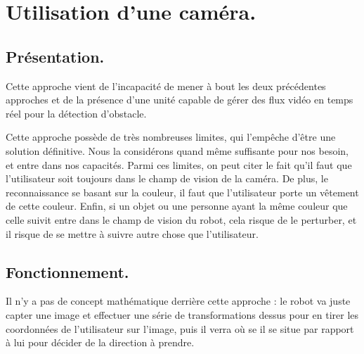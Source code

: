 \section{Utilisation d'une caméra.}
\subsection{Présentation.}
Cette approche vient de l'incapacité de mener à bout les deux précédentes approches et de la présence d'une unité capable de gérer des flux vidéo en temps réel pour la détection d'obstacle.

Cette approche possède de très nombreuses limites, qui l'empêche d'être une solution définitive. Nous la considérons quand même suffisante pour nos besoin, et entre dans nos capacités. Parmi ces limites, on peut citer le fait qu'il faut que l'utilisateur soit toujours dans le champ de vision de la caméra. De plus, le reconnaissance se basant sur la couleur, il faut que l'utilisateur porte un vêtement de cette couleur. Enfin, si un objet ou une personne ayant la même couleur que celle suivit entre dans le champ de vision du robot, cela risque de le perturber, et il risque de se mettre à suivre autre chose que l'utilisateur.

\subsection{Fonctionnement.}
Il n'y a pas de concept mathématique derrière cette approche : le robot va juste capter une image et effectuer une série de transformations dessus pour en tirer les coordonnées de l'utilisateur sur l'image, puis il verra où se il se situe par rapport à lui pour décider de la direction à prendre.

